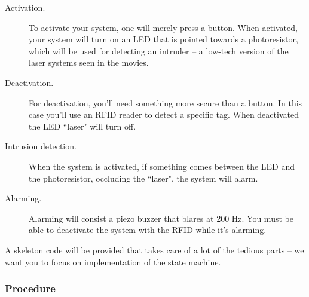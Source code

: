 \documentclass[11pt]{article} %
\begin{document}
\begin{description}
\item[ Activation.] To activate your system, one will merely press a button. When activated, your system will turn on an LED that is pointed towards a photoresistor, which will be used for detecting an intruder -- a low-tech version of the laser systems seen in the movies.
\item[ Deactivation.] For deactivation, you'll need something more secure than a button. In this case you'll use an RFID reader to detect a specific tag. When deactivated the LED ``laser" will turn off.
\item[ Intrusion detection.] When the system is activated, if something comes between the LED and the photoresistor, occluding the ``laser", the system will alarm.
\item[ Alarming.] Alarming will consist a piezo buzzer that blares at 200 Hz. You must be able to deactivate the system with the RFID while it’s alarming.
\end{description}

A skeleton code will be provided that takes care of a lot of the tedious parts -- we want you to focus on implementation of the state machine.

\subsubsection*{Procedure}
\end{document}
